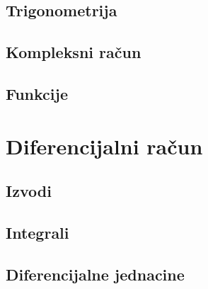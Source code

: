\subsection{Trigonometrija}

\subsection{Kompleksni ra\v cun}

\subsection{Funkcije}

\section{Diferencijalni ra\v cun}

\subsection{Izvodi}

\subsection{Integrali}

\subsection{Diferencijalne jednacine}